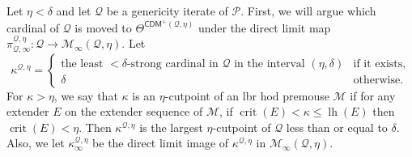 \documentclass{amsart}
\DeclareMathOperator{\crit}{crit}
\DeclareMathOperator{\lh}{lh}
\begin{document}
Let $\eta<\delta$ and let $\mathcal{Q}$ be a genericity iterate of $\mathcal{P}$.
First, we will argue which cardinal of $\mathcal{Q}$ is moved to $\Theta^{\mathsf{CDM}^+(\mathcal{Q}, \eta)}$ under the direct limit map $\pi^{\mathcal{Q}, \eta}_{\mathcal{Q}, \infty}\colon\mathcal{Q}\to\mathcal{M}_{\infty}(\mathcal{Q}, \eta)$.
Let
\[
\kappa^{\mathcal{Q}, \eta}=\begin{cases}
\text{the least ${<}\delta$-strong cardinal in $\mathcal{Q}$ in the interval $(\eta, \delta)$} & \text{if it exists,}\\
\delta & \text{otherwise.}
\end{cases}
\]
For $\kappa>\eta$, we say that $\kappa$ is an $\eta$-cutpoint of an lbr hod premouse $\mathcal{M}$ if for any extender $E$ on the extender sequence of $\mathcal{M}$, if $\crit(E)<\kappa\leq\lh(E)$ then $\crit(E)<\eta$.
Then $\kappa^{\mathcal{Q}, \eta}$ is the largest $\eta$-cutpoint of $\mathcal{Q}$ less than or equal to $\delta$.
Also, we let $\kappa^{\mathcal{Q}, \eta}_{\infty}$ be the direct limit image of $\kappa^{\mathcal{Q}, \eta}$ in $\mathcal{M}_{\infty}(\mathcal{Q}, \eta)$.
\end{document}
